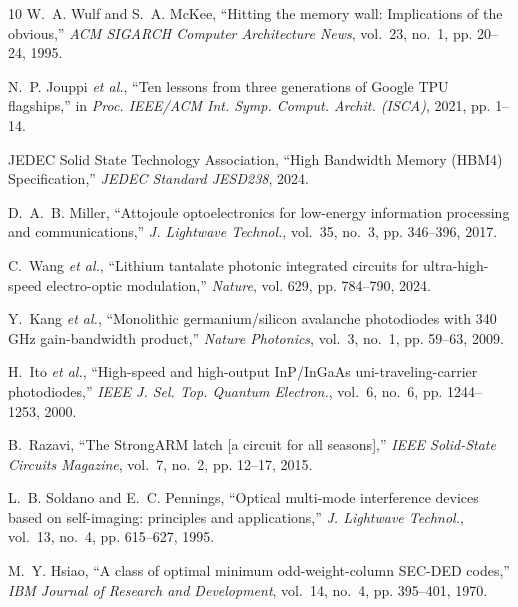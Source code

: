\documentclass[journal]{IEEEtran}
\begin{document}
\begin{thebibliography}{10}
W.~A. Wulf and S.~A. McKee, ``Hitting the memory wall: Implications of the obvious,'' \emph{ACM SIGARCH Computer Architecture News}, vol.~23, no.~1, pp. 20--24, 1995.

N.~P. Jouppi \emph{et al.}, ``Ten lessons from three generations of Google TPU flagships,'' in \emph{Proc. IEEE/ACM Int. Symp. Comput. Archit. (ISCA)}, 2021, pp. 1--14.

JEDEC Solid State Technology Association, ``High Bandwidth Memory (HBM4) Specification,'' \emph{JEDEC Standard JESD238}, 2024.

D.~A.~B. Miller, ``Attojoule optoelectronics for low-energy information processing and communications,'' \emph{J. Lightwave Technol.}, vol.~35, no.~3, pp. 346--396, 2017.

C.~Wang \emph{et al.}, ``Lithium tantalate photonic integrated circuits for ultra-high-speed electro-optic modulation,'' \emph{Nature}, vol. 629, pp. 784--790, 2024.

Y.~Kang \emph{et al.}, ``Monolithic germanium/silicon avalanche photodiodes with 340 GHz gain-bandwidth product,'' \emph{Nature Photonics}, vol.~3, no.~1, pp. 59--63, 2009.

H.~Ito \emph{et al.}, ``High-speed and high-output InP/InGaAs uni-traveling-carrier photodiodes,'' \emph{IEEE J. Sel. Top. Quantum Electron.}, vol.~6, no.~6, pp. 1244--1253, 2000.

B.~Razavi, ``The StrongARM latch [a circuit for all seasons],'' \emph{IEEE Solid-State Circuits Magazine}, vol.~7, no.~2, pp. 12--17, 2015.

L.~B. Soldano and E.~C. Pennings, ``Optical multi-mode interference devices based on self-imaging: principles and applications,'' \emph{J. Lightwave Technol.}, vol.~13, no.~4, pp. 615--627, 1995.

M.~Y. Hsiao, ``A class of optimal minimum odd-weight-column SEC-DED codes,'' \emph{IBM Journal of Research and Development}, vol.~14, no.~4, pp. 395--401, 1970.
\end{thebibliography}
\end{document}
